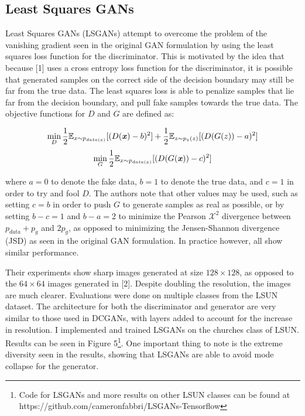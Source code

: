 \documentclass[9pt]{article}
\begin{document}
\subsection{Least Squares GANs}
Least Squares GANs (LSGANs) attempt to overcome the problem of the vanishing gradient seen in the original GAN formulation by using the least squares loss function for the
discriminator. This is motivated by the idea that because [1] uses a cross entropy loss function for the discriminator, it is possible that generated samples on the correct side of the
decision boundary may still be far from the true data. The least squares loss is able to penalize samples that lie far from the decision boundary, and pull fake samples towards the
true data. The objective functions for $D$ and $G$ are defined as:

\[\min\limits_{D} \frac{1}{2} \mathbb{E}_{x \sim p_{data(x)}} [(D(\textbf{\textit{x}})-b)^2] + \frac{1}{2} \mathbb{E}_{z \sim p_z(z)}[(D(G(z)) - a)^2]\]
\[\min\limits_{G} \frac{1}{2} \mathbb{E}_{x \sim p_{data(x)}} [(D(G(\textbf{\textit{x}}))-c)^2] \]

\noindent where $a=0$ to denote the fake data, $b=1$ to denote the true data, and $c=1$ in order to try and fool $D$. The authors note that other values
may be used, such as setting $c=b$ in order to push $G$ to generate samples as real as possible, or by setting $b-c=1$ and $b-a=2$ to minimize the Pearson
$\mathcal{X}^2$ divergence between $p_{data}+p_g$ and $2p_g$, as opposed to minimizing the Jensen-Shannon divergence (JSD) as seen in the original GAN
formulation. In practice however, all show similar performance. \newline

\noindent Their experiments show sharp images generated at size $128\times128$, as opposed to the $64\times64$ images generated in [2]. Despite doubling
the resolution, the images are much clearer. Evaluations were done on multiple classes from the LSUN dataset. The architecture for both the discriminator
and generator are very similar to those used in DCGANs, with layers added to account for the increase in resolution. I implemented and trained LSGANs on the churches
class of LSUN. Results can be seen in Figure 5\footnote{Code for LSGANs and more results on other LSUN classes can be found at https://github.com/cameronfabbri/LSGANs-Tensorflow}.
One important thing to note is the extreme diversity seen in the results, showing that LSGANs are able to avoid mode collapse for the generator.
\end{document}
